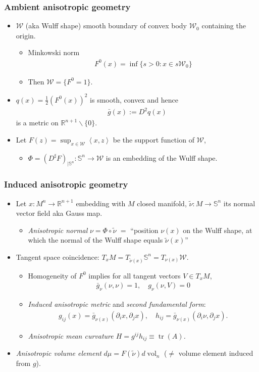 \documentclass{beamer}
\newcommand{\ti}{\tilde}
\newcommand{\bs}{\backslash}
\newcommand{\cn}{\colon}
\newcommand{\bbR}{\mathbb{R}}
\newcommand{\bbS}{\mathbb{S}}
\newcommand{\8}{\infty}
\newcommand{\cW}{\mathcal{W}}
\newcommand{\del}{\partial}
\newcommand{\ip}[2]{\left\langle #1,#2 \right\rangle}
\newcommand{\fr}[2]{\frac{#1}{#2}}
\DeclareMathOperator{\tr}{tr}
\DeclareMathOperator{\vol}{vol}
\newcommand{\eq}[1]{\begin{equation}\begin{alignedat}{2} #1 \end{alignedat}\end{equation}}
\newcommand{\ra}{\rightarrow}
\newcommand{\q}{\quad}
\begin{document}
\begin{frame} 
\frametitle{Ambient anisotropic geometry}

\begin{itemize}
\item $\cW$ (aka Wulff shape) smooth boundary of convex body $\cW_{0}$ containing the origin. 
	\begin{itemize}
		\item Minkowski norm
		\eq{F^{0}(x) = \inf\{s>0\cn x\in s\cW_{0}\}}
		\item Then $\cW = \{F^{0}=1\}.$
	\end{itemize}
\item $q(x) = \fr{1}{2}(F^{0}(x))^{2}$ is smooth, convex and hence 
\eq{\bar g(x):=D^{2}q(x)}
is a metric on $\bbR^{n+1}\bs\{0\}$.
\item Let $F(z)=\sup_{x\in \cW}\ip{x}{z}$ be the support function of $\cW$,
	\begin{itemize}
		\item $\Phi = (D^{\sharp}F)_{|\bbS^{n}}\cn \bbS^{n}\ra \cW$ is an embedding of the Wulff shape.
	\end{itemize}
\end{itemize}
\end{frame}

\begin{frame} 
\frametitle{Induced anisotropic geometry}

\begin{itemize}
\item Let $x\cn M^{n}\ra \bbR^{n+1}$ embedding with $M$ closed manifold, $\ti\nu\cn M\ra \bbS^{n}$ its normal vector field aka Gauss map.
	\begin{itemize}
		\item {\it Anisotropic normal} $\nu = \Phi\circ \ti \nu$ $=$ ``position $\nu(x)$ on the Wulff shape, at which the normal of the Wulff shape equals $\ti\nu(x)$''
	\end{itemize}  
\item Tangent space coincidence: $T_{x}M = T_{\ti\nu(x)}\bbS^{n} = T_{\nu(x)}\cW$.
	\begin{itemize}
		\item Homogeneity of $F^{0}$ implies for all tangent vectors $V\in T_{x}M$,
		\eq{\bar g_{\nu}(\nu,\nu) = 1,\q g_{\nu}(\nu,V) = 0}
		\item {\it Induced anisotropic metric} and {\it second fundamental form}: 
		\eq{g_{ij}(x) = \bar g_{\nu(x)}(\del_{i}x,\del_{j}x),\q h_{ij} = \bar g_{\nu(x)}(\del_{i}\nu,\del_{j}x).}
		\item {\it Anisotropic mean curvature $H = g^{ij}h_{ij} \equiv \tr(A)$.}	
	\end{itemize}
\item {\it Anisotropic volume element} $d\mu = F(\ti \nu)d\vol_{n}$ ($\neq$ volume element induced from $g$).
\end{itemize}
\end{frame}
\end{document}
